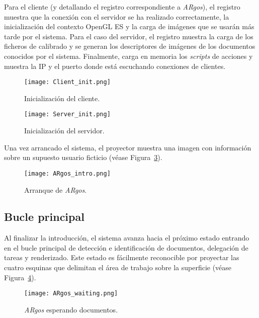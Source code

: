 Para el cliente (y detallando el registro correspondiente a \textit{ARgos}), el registro muestra que la conexión con el servidor se ha realizado correctamente, la inicialización del contexto OpenGL ES y la carga de imágenes que se usarán más tarde por el sistema. Para el caso del servidor, el registro muestra la carga de los ficheros de calibrado y se generan los descriptores de imágenes de los documentos conocidos por el sistema. Finalmente, carga en memoria los \textit{scripts} de acciones y muestra la IP y el puerto donde está escuchando conexiones de clientes.

\begin{figure}[!h]
  \begin{center}
    \texttt{[image: Client\_init.png]}
    \caption{Inicialización del cliente.}
    \label{fig:Client_init}
  \end{center}
\end{figure}

\begin{figure}[!h]
  \begin{center}
    \texttt{[image: Server\_init.png]}
    \caption{Inicialización del servidor.}
    \label{fig:Server_init}
  \end{center}
\end{figure}

Una vez arrancado el sistema, el proyector muestra una imagen con información sobre un supuesto usuario ficticio (véase Figura~\ref{fig:ARgos_intro}).

\begin{figure}
  \begin{center}
    \texttt{[image: ARgos\_intro.png]}
    \caption{Arranque de \textit{ARgos}.}
    \label{fig:ARgos_intro}
  \end{center}
\end{figure}

\subsection{Bucle principal}
Al finalizar la introducción, el sistema avanza hacia el próximo estado entrando en el bucle principal de detección e identificación de documentos, delegación de tareas y renderizado. Este estado es fácilmente reconocible por proyectar las cuatro esquinas que delimitan el área de trabajo sobre la superficie (véase Figura~\ref{fig:ARgos_waiting}).

\begin{figure}
  \begin{center}
    \texttt{[image: ARgos\_waiting.png]}
    \caption{\textit{ARgos} esperando documentos.}
    \label{fig:ARgos_waiting}
  \end{center}
\end{figure}

